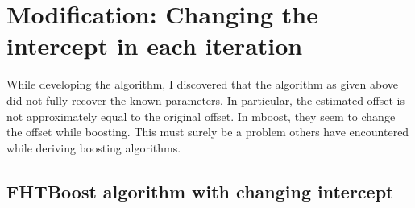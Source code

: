 
\section{Modification: Changing the intercept in each iteration}
While developing the algorithm, I discovered that the algorithm as given above did not fully recover the known parameters.
In particular, the estimated offset is not approximately equal to the original offset.
In mboost, they seem to change the offset while boosting.
This must surely be a problem others have encountered while deriving boosting algorithms.

\subsection{FHTBoost algorithm with changing intercept}
\label{algo:fhtboost-with-intercept}
